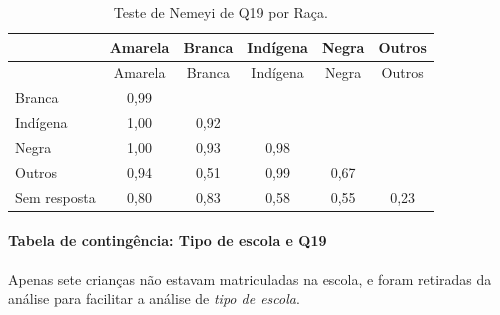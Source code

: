 \documentclass[]{article}
\let\oldparagraph\paragraph
\renewcommand{\paragraph}[1]{\oldparagraph{#1}\mbox{}}
\begin{document}
\begin{longtable}[]{@{}lccccc@{}}
\caption{\label{tab:unnamed-chunk-277}Teste de Nemeyi de Q19 por Raça.}\tabularnewline
\toprule
& Amarela & Branca & Indígena & Negra & Outros\tabularnewline
\midrule
\endfirsthead
\toprule
& Amarela & Branca & Indígena & Negra & Outros\tabularnewline
\midrule
\endhead
Branca & 0,99 & & & &\tabularnewline
Indígena & 1,00 & 0,92 & & &\tabularnewline
Negra & 1,00 & 0,93 & 0,98 & &\tabularnewline
Outros & 0,94 & 0,51 & 0,99 & 0,67 &\tabularnewline
Sem resposta & 0,80 & 0,83 & 0,58 & 0,55 & 0,23\tabularnewline
\bottomrule
\end{longtable}

\cleardoublepage

\hypertarget{tabela-de-continguxeancia-tipo-de-escola-e-q19}{%
\paragraph{Tabela de contingência: Tipo de escola e Q19}\label{tabela-de-continguxeancia-tipo-de-escola-e-q19}}

Apenas sete crianças não estavam matriculadas na escola, e foram retiradas da análise para facilitar a análise de \emph{tipo de escola}.
\end{document}
